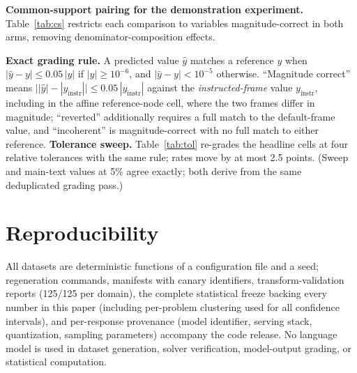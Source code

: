 \documentclass{article}
\begin{document}
\textbf{Common-support pairing for the demonstration experiment.}
Table~\ref{tab:cs} restricts each comparison to variables magnitude-correct in
both arms, removing denominator-composition effects.
\begin{table}[h]\centering\small
\caption{Paired common-support analysis of worked demonstrations (circuits,
counter-clockwise cell).}
\label{tab:cs}

\end{table}

\textbf{Exact grading rule.} A predicted value $\hat y$ matches a reference $y$
when $|\hat y-y|\le 0.05\,|y|$ if $|y|\ge 10^{-6}$, and $|\hat y-y|<10^{-5}$
otherwise. ``Magnitude correct'' means $\big||\hat y|-|y_{\mathrm{instr}}|\big|
\le 0.05\,|y_{\mathrm{instr}}|$ against the \emph{instructed-frame} value
$y_{\mathrm{instr}}$, including in the affine reference-node cell, where the two
frames differ in magnitude; ``reverted'' additionally requires a full match to the
default-frame value, and ``incoherent'' is magnitude-correct with no full match to
either reference. \textbf{Tolerance sweep.} Table~\ref{tab:tol} re-grades the
headline cells at four relative tolerances with the same rule; rates move by at
most 2.5 points. (Sweep and main-text values at 5\% agree exactly; both derive
from the same deduplicated grading pass.)
\begin{table}[h]\centering\small
\caption{Reversion rate by grading tolerance.}
\label{tab:tol}

\end{table}

\section{Reproducibility}\label{app:repro}
All datasets are deterministic functions of a configuration file and a seed;
regeneration commands, manifests with canary identifiers, transform-validation
reports (125/125 per domain), the complete statistical freeze backing every
number in this paper (including per-problem clustering used for all confidence
intervals), and per-response provenance (model identifier, serving stack,
quantization, sampling parameters) accompany the code release. No language model is used in dataset generation, solver verification,
model-output grading, or statistical computation.
\end{document}
